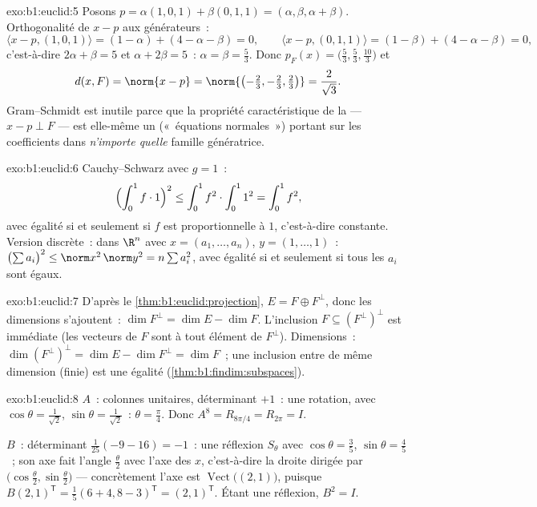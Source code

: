 \begin{solution}{exo:b1:euclid:5}
Posons $p = \alpha(1,0,1) + \beta(0,1,1) = (\alpha, \beta, \alpha +
\beta)$. Orthogonalité de $x - p$ aux générateurs~:
\[
\langle x - p, (1,0,1)\rangle = (1 - \alpha) + (4 - \alpha - \beta)
= 0,
\qquad
\langle x - p, (0,1,1)\rangle = (1 - \beta) + (4 - \alpha - \beta)
= 0,
\]
c'est-à-dire $2\alpha + \beta = 5$ et $\alpha + 2\beta = 5$~: $\alpha =
\beta = \frac53$. Donc $p_F(x) = \bigl(\frac53, \frac53,
\frac{10}{3}\bigr)$ et
\[
d(x, F) = \norm{x - p} =
\norm{\bigl(-\tfrac23, -\tfrac23, \tfrac23\bigr)} =
\frac{2}{\sqrt 3} .
\]
Gram--Schmidt est inutile parce que la propriété caractéristique de
la  --- $x - p \perp F$ --- est elle-même un  («~équations normales~») portant sur les coefficients dans
\emph{n'importe quelle} famille génératrice.
\end{solution}

\begin{solution}{exo:b1:euclid:6}
Cauchy--Schwarz avec $g = 1$~:
\[
\Bigl(\int_0^1 f \cdot 1\Bigr)^2 \leq \int_0^1 f^2 \cdot \int_0^1
1^2 = \int_0^1 f^2 ,
\]
avec égalité si et seulement si $f$ est proportionnelle à $1$,
c'est-à-dire constante. Version discrète~: dans $\R^n$ avec $x = (a_1,
\dots, a_n)$, $y = (1, \dots, 1)$~:
$\bigl(\sum a_i\bigr)^2 \leq \norm x^2\, \norm y^2 = n \sum a_i^2$,
avec égalité si et seulement si tous les $a_i$ sont égaux.
\end{solution}

\begin{solution}{exo:b1:euclid:7}
D'après le \cref{thm:b1:euclid:projection}, $E = F \oplus F^\perp$, donc
les dimensions s'ajoutent~: $\dim F^\perp = \dim E - \dim F$.
L'inclusion $F \subseteq (F^\perp)^\perp$ est immédiate (les vecteurs
de $F$ sont  à tout élément de $F^\perp$). Dimensions~:
$\dim(F^\perp)^\perp = \dim E - \dim F^\perp = \dim F$~; une
inclusion entre  de même dimension (finie) est une égalité
(\cref{thm:b1:findim:subspaces}).
\end{solution}

\begin{solution}{exo:b1:euclid:8}
$A$~: colonnes unitaires, déterminant $+1$~: une rotation, avec
$\cos\theta = \frac{1}{\sqrt2}$, $\sin\theta = \frac{1}{\sqrt2}$~:
$\theta = \frac\pi4$. Donc $A^8 = R_{8\pi/4} = R_{2\pi} = I$.

$B$~: déterminant $\frac{1}{25}(-9 - 16) = -1$~: une réflexion
$S_\theta$ avec $\cos\theta = \frac35$, $\sin\theta = \frac45$~; son
axe fait l'angle $\frac\theta2$ avec l'axe des $x$, c'est-à-dire la
droite dirigée par $\bigl(\cos\frac\theta2, \sin\frac\theta2\bigr)$
--- concrètement l'axe est
$\operatorname{Vect}\bigl((2, 1)\bigr)$, puisque $B(2,1)^{\mathsf T} =
\frac15(6+4, 8-3)^{\mathsf T} = (2,1)^{\mathsf T}$. Étant une
réflexion, $B^2 = I$.
\end{solution}

